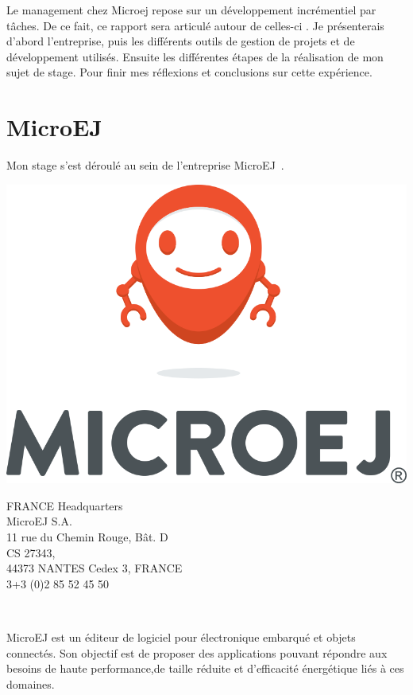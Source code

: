 \documentclass[french,a4paper,12pt]{report}
\begin{document}
Le management chez Microej repose sur un développement incrémentiel par tâches. De ce fait, ce rapport sera articulé autour de celles-ci . Je présenterais d’abord l’entreprise, puis les différents outils de gestion de projets et de développement utilisés. Ensuite les différentes étapes de la réalisation de mon sujet de stage. Pour finir mes réflexions et conclusions sur cette expérience. 

\chapter{MicroEJ}

Mon stage s’est déroulé au sein de l’entreprise MicroEJ .\\

\bigskip

\noindent
\begin{minipage}[c]{0.5\textwidth}
\centering
\includegraphics[width=0.8\linewidth]{ressources/logos/vertical_mascot_huge.png}
\end{minipage}
\noindent
\begin{minipage}[c]{0.49\textwidth}\raggedright
 FRANCE Headquarters\\
 MicroEJ S.A.\\
 11 rue du Chemin Rouge, Bât. D\\
 CS 27343,\\
 44373 NANTES Cedex 3, FRANCE\\
 3+3 (0)2 85 52 45 50\\
\end{minipage}\\

\bigskip

MicroEJ est un éditeur de logiciel pour électronique embarqué et objets connectés. Son objectif est de proposer des applications pouvant répondre aux besoins de haute performance,de taille réduite et d'efficacité énergétique liés à ces domaines.
\end{document}
